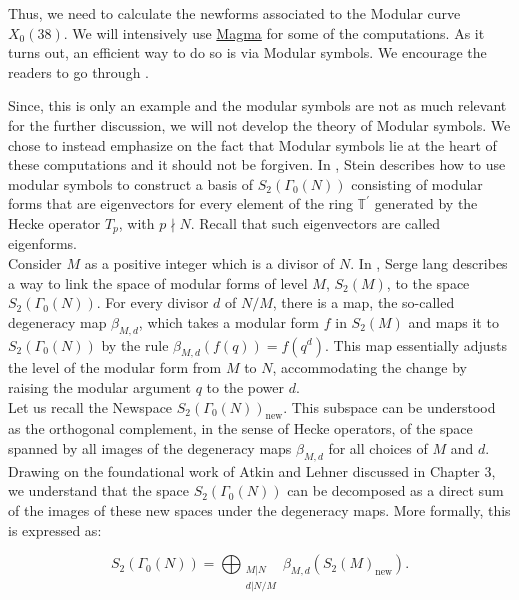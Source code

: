 Thus, we need to calculate the newforms associated to the Modular curve $X_0(38)$. We will intensively use \hyperlink{http://magma.maths.usyd.edu.au/magma/handbook/modular_symbols}{Magma} for some of the computations. As it turns out, an efficient way to do so is via Modular symbols. We encourage the readers to go through \cite{SteinModularForms2007}. 

Since, this is only an example and the modular symbols are not as much relevant for the further discussion, we will not develop the theory of Modular symbols. We chose to instead emphasize on the fact that Modular symbols lie at the heart of these computations and it should not be forgiven.
In \cite{SteinModularForms2007}, Stein describes how to use modular symbols to construct a basis of $S_{2}\left(\Gamma_{0}(N)\right)$ consisting of modular forms that are eigenvectors for every element of the ring $\mathbb{T}^{\prime}$ generated by the Hecke operator $T_{p}$, with $p \nmid N$. Recall that such eigenvectors are called eigenforms.\\


Consider \( M \) as a positive integer which is a 
divisor of \( N \). In \cite{Lang1995}, Serge lang describes a way to link the space of modular forms of level \( M \), \( S_{2}(M) \), to the space \( S_{2}(\Gamma_{0}(N)) \).
For every divisor \( d \) of \( N/M \), there is a map, the so-called degeneracy map \( \beta_{M, d} \), which takes a modular form \( f \) in \( S_{2}(M) \) and maps it to \( S_{2}(\Gamma_{0}(N)) \) by the rule \( \beta_{M, d}(f(q)) = f(q^d) \). This 
 map essentially adjusts the level of the modular form from \( M \) to \( N \), accommodating the change by raising the modular argument \( q \) to the power \( d \).\\

Let us recall the Newspace \( S_{2}(\Gamma_{0}(N))_{\text{new}} \). This subspace can be understood as the orthogonal complement, in the sense of Hecke operators, of the space spanned by all images of the degeneracy maps \( \beta_{M, d} \) for all choices of \( M \) and \( d \).\\

Drawing on the foundational work of Atkin and Lehner discussed in Chapter 3, we understand that the space \( S_{2}(\Gamma_{0}(N)) \) can be decomposed as a direct sum of the images of these new spaces under the degeneracy maps. More formally, this is expressed as:

\[
S_{2}(\Gamma_{0}(N)) = \bigoplus_{\substack{M|N \\ d|N/M}} \beta_{M, d}(S_{2}(M)_{\text{new}}).
\]

